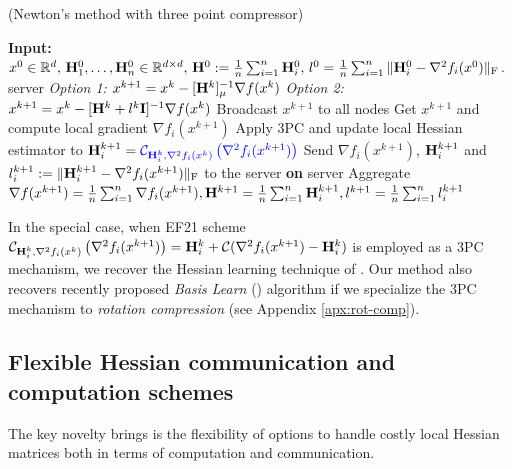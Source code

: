 \documentclass[11pt]{article}
\begin{document}
	\begin{algorithm}[H]
		\caption{ (Newton's method with {\color{blue}three point compressor}) }
		\label{alg:N3PC}
		\begin{algorithmic}[1]
			\STATE \textbf{Input:} $x^0\in\mathbb{R}^d,\, \mathbf{H}_1^0, \dots, \mathbf{H}_n^0 \in \mathbb{R}^{d\times d},\, \mathbf{H}^0 \; { := }\; \frac{1}{n}\sum_{i=1}^n \mathbf{H}_i^0,\, l^0 = \frac{1}{n}\sum_{i=1}^n \|\mathbf{H}_i^0 - \nabla^2 f_i(x^0)\|_{\rm F}$.
			 server 
			\STATE \quad \textit{Option 1:} $x^{k+1} = x^k - [\mathbf{H}^{k}]_{\mu}^{-1} \nabla f(x^k)$
			\STATE \quad \textit{Option 2:} $x^{k+1} = x^k - [\mathbf{H}^{k} + l^k\mathbf{I}]^{-1} \nabla f(x^k)$
			\STATE \quad Broadcast $x^{k+1}$ to all nodes
			\STATE Get $x^{k+1}$ and compute local gradient $\nabla f_i(x^{k+1})$ %
			\STATE Apply {\color{blue}3PC} and update local Hessian estimator to $\mathbf{H}_i^{k+1} = {\color{blue}{\mathcal{C}}_{\mathbf{H}_i^k,\nabla^2f_i(x^k)}\left(\nabla^2f_i(x^{k+1})\right)}$
			\STATE Send $\nabla f_i(x^{k+1})$,\; $\mathbf{H}^{k+1}_i$ and $l_i^{k+1} \; { := }\; \|\mathbf{H}_i^{k+1} - \nabla^2 f_i(x^{k+1})\|_{\rm F}$ to the server
			\ENDFOR
			\STATE \textbf{on} server
			\STATE \quad Aggregate $ \nabla f(x^{k+1}) = \frac{1}{n}\sum_{i=1}^n \nabla f_i(x^{k+1}), \mathbf{H}^{k+1} = \frac{1}{n}\sum_{i=1}^n\mathbf{H}_i^{k+1}, l^{k+1} = \frac{1}{n}\sum_{i=1}^n l_i^{k+1}$
		\end{algorithmic}
	\end{algorithm}
	
	
	In the special case, when EF21 scheme ${\mathcal{C}}_{\mathbf{H}_i^k,\nabla^2f_i(x^k)}\left(\nabla^2f_i(x^{k+1})\right) = \mathbf{H}_i^k + {\mathcal{C}}(\nabla^2f_i(x^{k+1}) - \mathbf{H}_i^k)$ is employed as a 3PC mechanism, we recover the Hessian learning technique of . Our  method also recovers recently proposed {\em Basis Learn} () \citep{qian2021basis} algorithm if we specialize the 3PC mechanism to {\em rotation compression} (see Appendix \ref{apx:rot-comp}).
	
	\subsection{Flexible Hessian communication and computation schemes}
	The key novelty  brings is the flexibility of options to handle costly local Hessian matrices both in terms of computation and communication.
	
\end{document}
